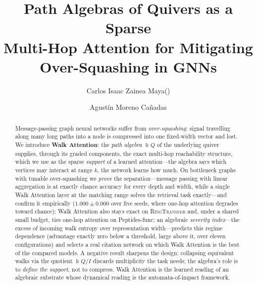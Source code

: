 \documentclass[runningheads]{llncs}
\newcommand{\kk}{\Bbbk}
\newcommand{\kQ}{\kk Q}
\begin{document}
\title{Path Algebras of Quivers as a Sparse\\ Multi-Hop Attention for Mitigating\\ Over-Squashing in GNNs}

\author{Carlos Isaac Zainea Maya(\Letter) \and
Agust\'in Moreno Ca\~nadas}

\maketitle

\begin{abstract}
Message-passing graph neural networks suffer from \emph{over-squashing}: signal
travelling along many long paths into a node is compressed into one fixed-width
vector and lost. We introduce \textbf{Walk Attention}: the \emph{path algebra}
$\kQ$ of the underlying quiver supplies, through its graded components, the
exact multi-hop reachability structure, which we use as the sparse
\emph{support} of a learned attention---the algebra says which vertices may
interact at range $k$, the network learns how much. On bottleneck graphs with
tunable over-squashing we \emph{prove} the separation---message passing with
linear aggregation is at exactly chance accuracy for every depth and width,
while a single Walk Attention layer at the matching range solves the retrieval
task exactly---and confirm it empirically ($1.000\pm0.000$ over five seeds,
where one-hop attention degrades toward chance); Walk Attention also stays
exact on \textsc{RingTransfer} and, under a shared small budget, ties one-hop
attention on Peptides-func; an algebraic \emph{severity index}---the excess of
incoming walk entropy over representation width---predicts this regime
dependence (advantage exactly zero below a threshold, large above it, over
eleven configurations) and selects a real citation network on which Walk
Attention is the best of the compared models. A negative result sharpens
the design: collapsing equivalent walks via the quotient $\kQ/I$ discards
multiplicity the task needs; the algebra's role is to \emph{define the support},
not to compress. Walk Attention is the learned reading of an algebraic
substrate whose dynamical reading is the automata-of-impact framework.

\end{abstract}
\end{document}
